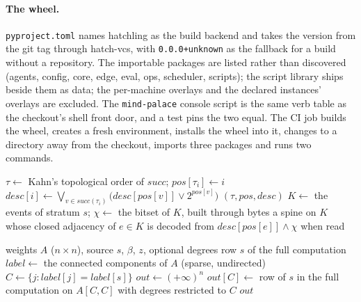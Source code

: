 \documentclass[11pt]{article}
\theoremstyle{plain}
\theoremstyle{definition}
\theoremstyle{remark}
\begin{document}
\paragraph{The wheel.} \texttt{pyproject.toml} names hatchling as the build backend and takes the
version from the git tag through hatch-vcs, with \texttt{0.0.0+unknown} as the fallback for a build
without a repository. The importable packages are listed rather than discovered (agents, config,
core, edge, eval, ops, scheduler, scripts); the script library ships beside them as data; the
per-machine overlays and the declared instances' overlays are excluded. The \texttt{mind-palace}
console script is the same verb table
as the checkout's shell front door, and a test pins the two equal. The CI job builds the wheel,
creates a fresh environment, installs the wheel into it, changes to a directory away from the
checkout, imports three packages and runs two commands.

\begin{algorithm}[t]
\caption{Restricting the spine to a stratum through the reachability index.}\label{alg:index}
\begin{algorithmic}[1]
 
  \State $\tau \gets$ Kahn's topological order of $\mathit{succ}$; \quad $\mathit{pos}[\tau_i] \gets i$
    \State $\mathit{desc}[i] \gets \bigvee_{v \in \mathit{succ}(\tau_i)}
      \bigl(\mathit{desc}[\mathit{pos}[v]] \vee 2^{\mathit{pos}[v]}\bigr)$
  \EndFor
  \State \Return $(\tau, \mathit{pos}, \mathit{desc})$
\EndFunction
{}
  \State $K \gets$ the events of stratum $s$; \quad $\chi \gets$ the bitset of $K$, built through
    bytes
  \State \Return a spine on $K$ whose closed adjacency of $e \in K$ is decoded from
    $\mathit{desc}[\mathit{pos}[e]] \wedge \chi$ when read
\EndFunction
\end{algorithmic}
\end{algorithm}

\begin{algorithm}[t]
\caption{One row of the free-energy distance.}\label{alg:component}
\begin{algorithmic}[1]
\Require weights $A$ ($n \times n$), source $s$, $\beta$, $z$, optional degrees
 \Return row $s$ of the full computation \EndIf
\State $\mathit{label} \gets$ the connected components of $A$ (sparse, undirected)
\State $C \gets \{j : \mathit{label}[j] = \mathit{label}[s]\}$
\State $\mathit{out} \gets (+\infty)^n$
\State $\mathit{out}[C] \gets$ row of $s$ in the full computation on $A[C, C]$ with degrees
  restricted to $C$
\State \Return $\mathit{out}$
\end{algorithmic}
\end{algorithm}
\end{document}
